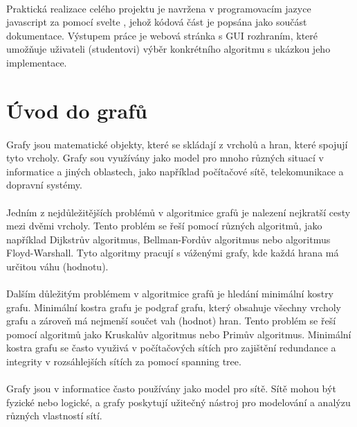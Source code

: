 \documentclass[12pt, titlepage, a4paper]{article}
\begin{document}
\paragraph{}
Praktická realizace celého projektu je navržena v programovacím jazyce javascript za pomocí svelte
, jehož kódová část je popsána jako součást dokumentace. Výstupem práce je webová stránka 
s GUI rozhraním, které umožňuje uživateli (studentovi) výběr konkrétního algoritmu s ukázkou jeho implementace.

\section{Úvod do grafů}
\paragraph{}
Grafy jsou matematické objekty, které se skládají z vrcholů a hran, které spojují tyto 
vrcholy. Grafy sou využívány jako model pro mnoho různých situací v informatice a jiných 
oblastech, jako například počítačové sítě, telekomunikace a dopravní systémy.
\paragraph{}
Jedním z nejdůležitějších problémů v algoritmice grafů je nalezení nejkratší cesty mezi 
dvěmi vrcholy. Tento problém se řeší pomocí různých algoritmů, jako například Dijkstrův 
algoritmus, Bellman-Fordův algoritmus nebo algoritmus Floyd-Warshall. Tyto algoritmy 
pracují s váženými grafy, kde každá hrana má určitou váhu (hodnotu).
\paragraph{}
Dalším důležitým problémem v algoritmice grafů je hledání minimální kostry grafu. Minimální 
kostra grafu je podgraf grafu, který obsahuje všechny vrcholy grafu a zároveň má nejmenší 
součet vah (hodnot) hran. Tento problém se řeší pomocí algoritmů jako Kruskalův algoritmus nebo Primův 
algoritmus. Minimální kostra grafu se často využivá v počítačových sítích pro zajištění redundance
a integrity v rozsáhlejších sítích za pomocí spanning tree.
\paragraph{}
Grafy jsou v informatice často používány jako model pro sítě. Sítě mohou být fyzické nebo 
logické, a grafy poskytují užitečný nástroj pro modelování a analýzu různých vlastností sítí.
\end{document}
